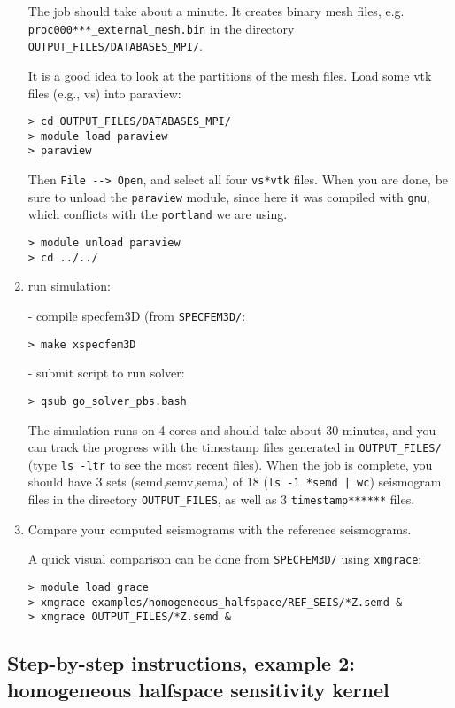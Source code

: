 \documentclass[10pt,titlepage,fleqn]{article}
\begin{document}
\begin{enumerate}
The job should take about a minute.
It creates binary mesh files, e.g. \verb+proc000***_external_mesh.bin+ in the directory \verb+OUTPUT_FILES/DATABASES_MPI/+.

It is a good idea to look at the partitions of the mesh files. Load some vtk files (e.g., vs) into paraview:
\begin{verbatim}
> cd OUTPUT_FILES/DATABASES_MPI/
> module load paraview
> paraview
\end{verbatim}
%
Then \verb+File --> Open+, and select all four \verb+vs*vtk+ files. When you are done, be sure to unload the \verb+paraview+ module, since here it was compiled with \verb+gnu+, which conflicts with the \verb+portland+ we are using.
%
\begin{verbatim}
> module unload paraview
> cd ../../
\end{verbatim}

\item run simulation:

   - compile specfem3D (from \verb+SPECFEM3D/+:
\begin{verbatim}
> make xspecfem3D
\end{verbatim}
   - submit script to run solver:
\begin{verbatim}
> qsub go_solver_pbs.bash
\end{verbatim}

The simulation runs on 4 cores and should take about 30 minutes, and you can track the progress with the timestamp files generated in \verb+OUTPUT_FILES/+ (type \verb+ls -ltr+ to see the most recent files). When the job is complete, you should have 3 sets (semd,semv,sema) of 18 (\verb+ls -1 *semd | wc+) seismogram files in the directory \verb+OUTPUT_FILES+, as well as 3 \verb+timestamp******+ files.

\item Compare your computed seismograms with the reference seismograms.

A quick visual comparison can be done from \verb+SPECFEM3D/+ using \verb+xmgrace+:
\begin{verbatim}
> module load grace
> xmgrace examples/homogeneous_halfspace/REF_SEIS/*Z.semd &
> xmgrace OUTPUT_FILES/*Z.semd &
\end{verbatim}

\end{enumerate}


\subsection*{Step-by-step instructions, example 2: homogeneous halfspace sensitivity kernel}
\end{document}
